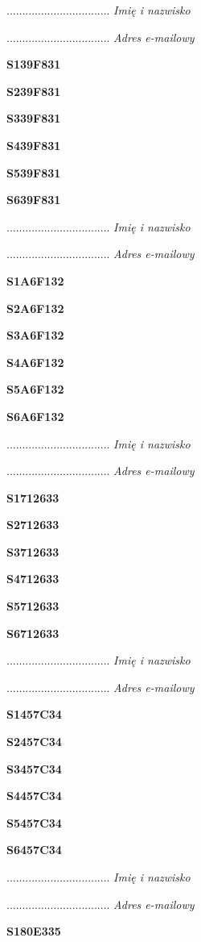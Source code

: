 .................................
\textit{Imię i nazwisko}

.................................
\textit{Adres e-mailowy}

\Large \textbf{S139F831}

\Large \textbf{S239F831}

\Large \textbf{S339F831}

\Large \textbf{S439F831}

\Large \textbf{S539F831}

\Large \textbf{S639F831}

.................................
\textit{Imię i nazwisko}

.................................
\textit{Adres e-mailowy}

\Large \textbf{S1A6F132}

\Large \textbf{S2A6F132}

\Large \textbf{S3A6F132}

\Large \textbf{S4A6F132}

\Large \textbf{S5A6F132}

\Large \textbf{S6A6F132}

.................................
\textit{Imię i nazwisko}

.................................
\textit{Adres e-mailowy}

\Large \textbf{S1712633}

\Large \textbf{S2712633}

\Large \textbf{S3712633}

\Large \textbf{S4712633}

\Large \textbf{S5712633}

\Large \textbf{S6712633}

.................................
\textit{Imię i nazwisko}

.................................
\textit{Adres e-mailowy}

\Large \textbf{S1457C34}

\Large \textbf{S2457C34}

\Large \textbf{S3457C34}

\Large \textbf{S4457C34}

\Large \textbf{S5457C34}

\Large \textbf{S6457C34}

.................................
\textit{Imię i nazwisko}

.................................
\textit{Adres e-mailowy}

\Large \textbf{S180E335}

